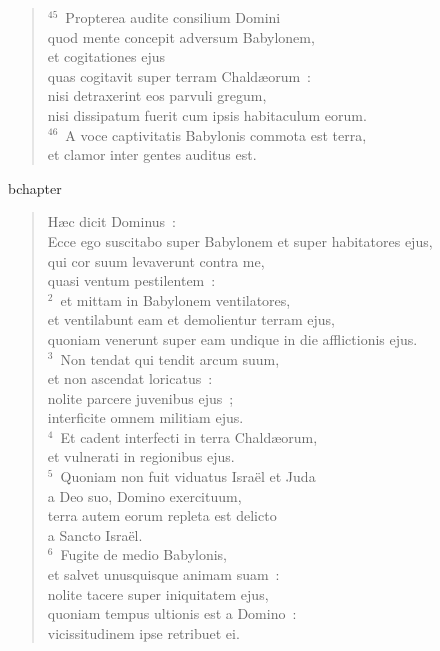 \begin{flushleft}
\begin{verse}
${}^{45}$~Propterea audite consilium Domini\\ quod mente concepit adversum Babylonem,\\ et cogitationes ejus\\ quas cogitavit super terram Chald\ae orum~:\\ nisi detraxerint eos parvuli gregum,\\ nisi dissipatum fuerit cum ipsis habitaculum eorum.\\
${}^{46}$~A voce captivitatis Babylonis commota est terra,\\ et clamor inter gentes auditus est.\end{verse}\end{flushleft}


bchapter\begin{flushleft}\begin{verse}\vspace{-19pt}\hspace{6pt}H\ae c dicit Dominus~:\\\hspace{6pt} Ecce ego suscitabo super Babylonem et super habitatores ejus,\\ qui cor suum levaverunt contra me,\\ quasi ventum pestilentem~:\\
${}^{2}$~et mittam in Babylonem ventilatores,\\ et ventilabunt eam et demolientur terram ejus,\\ quoniam venerunt super eam undique in die afflictionis ejus.\\
${}^{3}$~Non tendat qui tendit arcum suum,\\ et non ascendat loricatus~:\\ nolite parcere juvenibus ejus~;\\ interficite omnem militiam ejus.\\
${}^{4}$~Et cadent interfecti in terra Chald\ae orum,\\ et vulnerati in regionibus ejus.\\
${}^{5}$~Quoniam non fuit viduatus Isra\"el et Juda\\ a Deo suo, Domino exercituum,\\ terra autem eorum repleta est delicto\\ a Sancto Isra\"el.\\
${}^{6}$~Fugite de medio Babylonis,\\ et salvet unusquisque animam suam~:\\ nolite tacere super iniquitatem ejus,\\ quoniam tempus ultionis est a Domino~:\\ vicissitudinem ipse retribuet ei.\\

\end{verse}
\end{flushleft}
